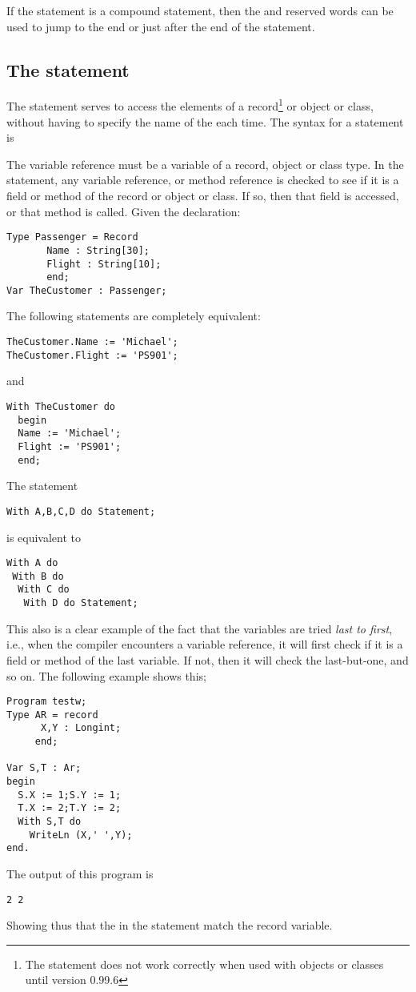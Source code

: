 \documentclass{report}
\begin{document}
If the statement is a compound statement, then  the  and 
 reserved words can be used to jump to the end or just 
after the end of the  statement.

\subsection{The  statement}
\label{se:With}
The  statement serves to access the elements of a record\footnote{
The  statement does not work correctly when used with
objects or classes until version 0.99.6}
or object or class, without having to specify the name of the each time.
The syntax for a  statement is

The variable reference must be a variable of a record, object or class type.
In the  statement, any variable reference, or method reference is
checked to see if it is a field or method of the record or object or class.
If so, then that field is accessed, or that method is called.
Given the declaration:
\begin{verbatim}
Type Passenger = Record
       Name : String[30];
       Flight : String[10];
       end;
Var TheCustomer : Passenger;
\end{verbatim}
The following statements are completely equivalent:
\begin{verbatim}
TheCustomer.Name := 'Michael';
TheCustomer.Flight := 'PS901';
\end{verbatim}
and
\begin{verbatim}
With TheCustomer do
  begin
  Name := 'Michael';
  Flight := 'PS901';
  end;
\end{verbatim}
The statement
\begin{verbatim}
With A,B,C,D do Statement;
\end{verbatim}
is equivalent to
\begin{verbatim}
With A do
 With B do
  With C do
   With D do Statement;
\end{verbatim}
This also is a clear example of the fact that the variables are tried {\em last
to first}, i.e., when the compiler encounters a variable reference, it will
first check if it is a field or method of the last variable. If not, then it
will check the last-but-one, and so on.
The following example shows this;
\begin{verbatim}
Program testw;
Type AR = record
      X,Y : Longint;
     end;

Var S,T : Ar;
begin
  S.X := 1;S.Y := 1;
  T.X := 2;T.Y := 2;
  With S,T do
    WriteLn (X,' ',Y);
end.
\end{verbatim}
The output of this program is
\begin{verbatim}
2 2
\end{verbatim}
Showing thus that the  in the  statement match the
 record variable.
\end{document}
